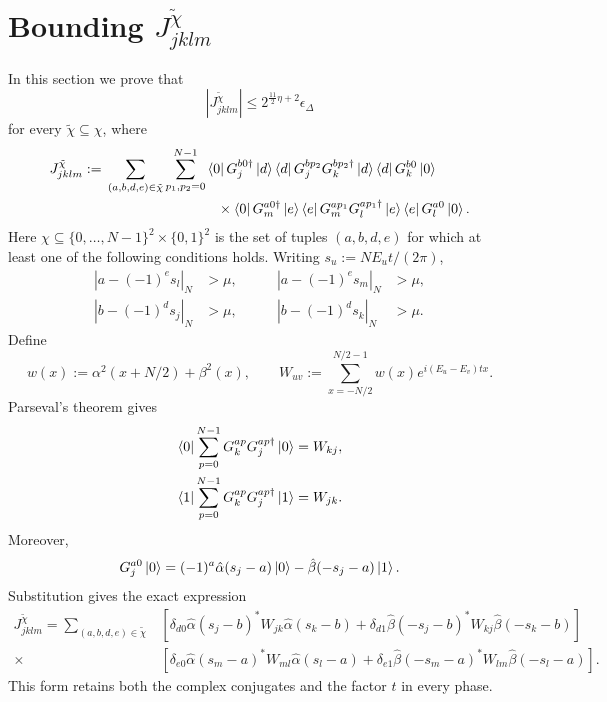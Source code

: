 \documentclass[aps,floatfix,10pt,amssymb,amsfont,amsmath,superscriptaddress,float,nofootinbib,longbibliography,nobalancelastpage,twocolumn]{revtex4-2}
\begin{document}
\section{Bounding $J^{\tilde\chi}_{jklm}$}
\label{appendix:bound_J}
In this section we prove that
\begin{equation}
    |J_{jklm}^{\tilde\chi}|\leq 2^{\frac{11}{2}\eta+2}\epsilon_{\Delta}
\end{equation}
for every $\tilde\chi\subseteq\chi$, where
\begin{equation}
\begin{split}
    J_{jklm}^{\tilde\chi}:={}&
    \sum_{(a,b,d,e)\in\tilde\chi}\sum_{p_1,p_2=0}^{N-1}
    \bra{0}G_j^{b0\dagger}\ket d
    \bra dG_j^{bp_2}G_k^{bp_2\dagger}\ket d
    \bra dG_k^{b0}\ket0\\
    &\hspace{28mm}\times
    \bra0G_m^{a0\dagger}\ket e
    \bra eG_m^{ap_1}G_l^{ap_1\dagger}\ket e
    \bra eG_l^{a0}\ket0.
\end{split}
\end{equation}
Here $\chi\subseteq\{0,\ldots,N-1\}^2\times\{0,1\}^2$ is the set of tuples $(a,b,d,e)$ for which at least one of the following conditions holds. Writing $s_u:=NE_ut/(2\pi)$,
\begin{equation}
\begin{aligned}
    |a-(-1)^es_l|_N &> \mu,\qquad &|a-(-1)^es_m|_N &> \mu,\\
    |b-(-1)^ds_j|_N &> \mu,\qquad &|b-(-1)^ds_k|_N &> \mu.
\end{aligned}
\end{equation}
Define
\begin{equation}
    w(x):=\alpha^2(x+N/2)+\beta^2(x),\qquad
    W_{uv}:=\sum_{x=-N/2}^{N/2-1}w(x)e^{i(E_u-E_v)tx}.
\end{equation}
Parseval's theorem gives
\begin{align}
    \bra0\sum_{p=0}^{N-1}G_k^{ap}G_j^{ap\dagger}\ket0&=W_{kj},\\
    \bra1\sum_{p=0}^{N-1}G_k^{ap}G_j^{ap\dagger}\ket1&=W_{jk}.
\end{align}
Moreover,
\begin{equation}
    G_j^{a0}\ket0=(-1)^a\hat\alpha(s_j-a)\ket0-\hat\beta(-s_j-a)\ket1.
\end{equation}
Substitution gives the exact expression
\begin{equation}
\begin{split}
J_{jklm}^{\tilde\chi}=\sum_{(a,b,d,e)\in\tilde\chi}
&\left[\delta_{d0}\hat\alpha(s_j-b)^*W_{jk}\hat\alpha(s_k-b)
+\delta_{d1}\hat\beta(-s_j-b)^*W_{kj}\hat\beta(-s_k-b)\right]\\
\times{}&\left[\delta_{e0}\hat\alpha(s_m-a)^*W_{ml}\hat\alpha(s_l-a)
+\delta_{e1}\hat\beta(-s_m-a)^*W_{lm}\hat\beta(-s_l-a)\right].
\end{split}
\end{equation}
This form retains both the complex conjugates and the factor $t$ in every phase.
\end{document}
